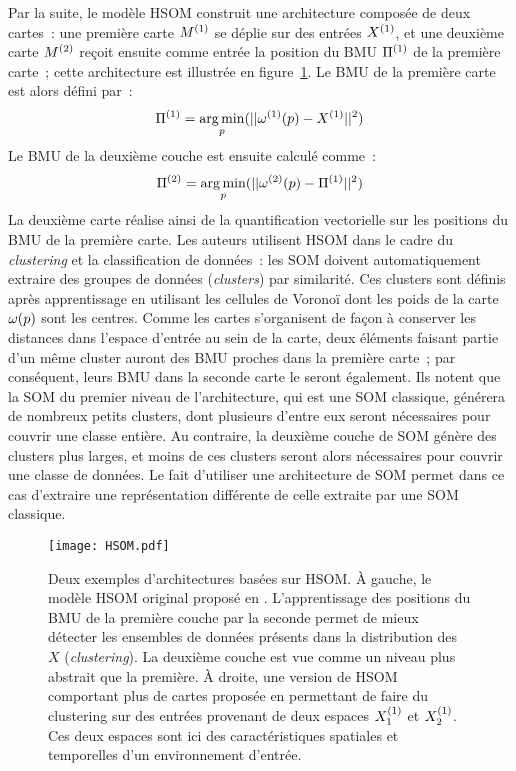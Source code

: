 \documentclass[../main]{subfiles}
\begin{document}
Par la suite, le modèle HSOM \parencite{lampinen_clustering_1992} construit une architecture composée de deux cartes~: une première carte $M^{({1})}$ se déplie sur des entrées $X^{({1})}$, et une deuxième carte $M^{({2})}$ reçoit ensuite comme entrée la position du BMU $\Pi^{({1})}$ de la première carte~; cette architecture est illustrée en figure~\ref{fig:hsom}.
Le BMU de la première carte est alors défini par~:
$$ \Pi^{({1})} = \operatorname*{arg\,min}\limits_p(||\omega^{({1})}(p) - X^{({1})} || ^2)$$
Le BMU de la deuxième couche est ensuite calculé comme~:
$$ \Pi^{({2})}= \operatorname*{arg\,min}\limits_p(||\omega^{({2})}(p) - \Pi^{({1})} || ^2)$$
La deuxième carte réalise ainsi de la quantification vectorielle sur les positions du BMU de la première carte. Les auteurs utilisent HSOM dans le cadre du \emph{clustering} et la classification de données~: les SOM doivent automatiquement extraire des groupes de données (\emph{clusters}) par similarité. Ces clusters sont définis après apprentissage en utilisant les cellules de Voronoï dont les poids de la carte $\omega(p)$ sont les centres.
Comme les cartes s'organisent de façon à conserver les distances dans l'espace d'entrée au sein de la carte, deux éléments faisant partie d'un même cluster auront des BMU proches dans la première carte~; par conséquent, leurs BMU dans la seconde carte le seront également. 
Ils notent que la SOM du premier niveau de l'architecture, qui est une SOM classique, générera de nombreux petits clusters, dont plusieurs d'entre eux seront nécessaires pour couvrir une classe entière. Au contraire, la deuxième couche de SOM génère des clusters plus larges, et moins de ces clusters seront alors nécessaires pour couvrir une classe de données.
Le fait d'utiliser une architecture de SOM permet dans ce cas d'extraire une représentation différente de celle extraite par une SOM classique.

\begin{figure}[t]
    \centering
    \texttt{[image: HSOM.pdf]}
    \caption{Deux exemples d'architectures basées sur HSOM. \`A gauche, le modèle HSOM original proposé en \cite{lampinen_clustering_1992}. L'apprentissage des positions du BMU de la première couche par la seconde permet de mieux détecter les ensembles de données présents dans la distribution des $X$ (\emph{clustering}).
    La deuxième couche est vue comme un niveau plus abstrait que la première. 
    \`A droite, une version de HSOM comportant plus de cartes proposée en \cite{hagenauer_hierarchical_2013} permettant de faire du clustering sur des entrées provenant de deux espaces $X_1^{({1})}$ et $X_2^{({1})}$. Ces deux espaces sont ici des caractéristiques spatiales et temporelles d'un environnement d'entrée.
    \label{fig:hsom}}
\end{figure}
\end{document}
